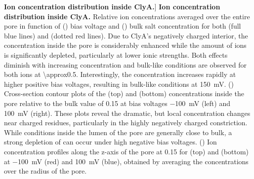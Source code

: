 \begin{figure*}[htbp]
\caption
[\textbf{Ion concentration distribution inside ClyA.}]
{
\textbf{Ion concentration distribution inside ClyA.}
Relative ion concentrations averaged over the entire pore in function of
() bias voltage and 
() bulk salt concentration for both  (full 
blue lines) and  (dotted red lines). Due to ClyA's negatively charged interior, the  
concentration inside the pore is considerably enhanced while the amount of  ions is significantly 
depleted, particularly at lower ionic strengths. Both effects diminish with increasing concentration and 
bulk-like conditions are observed for both ions at \SI{\approx0.5}{\Molar}. Interestingly, the  
concentration increases rapidly at higher positive bias voltages, resulting in bulk-like conditions at 
\SI{+150}{\milli\volt}.
() Cross-section contour plots of the  (top) and  (bottom) 
concentrations inside the pore relative to the bulk value of \SI{0.15}{\Molar} at bias voltages 
\SI{-100}{\mV} (left) and \SI{+100}{\mV} (right). These plots reveal the dramatic, but local concentration 
changes near charged residues, particularly in the highly negatively charged constriction. While conditions 
inside the lumen of the pore are generally close to bulk, a strong depletion of  can occur under high 
negative bias voltages.
() Ion concentration profiles along the z-axis of the pore at 
\SI{0.15}{\Molar} for  (top) and  (bottom) at \SI{-100}{\mV} (red) and \SI{+100}{\mV} (blue), 
obtained by averaging the concentrations over the radius of the pore.
}

\label{fig:concentration}

\end{figure*}